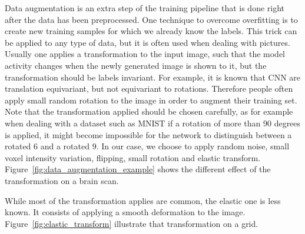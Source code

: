 Data augmentation is an extra step of the training pipeline that is done right after the data has been preprocessed. One technique to overcome overfitting is to create new training samples for which we already know the labels. This trick can be applied to any type of data, but it is often used when dealing with pictures. Usually one applies a transformation to the input image, such that the model activity changes when the newly generated image is shown to it, but the transformation should be labels invariant. 
For example, it is known that CNN are translation equivariant, but not equivariant to rotations. Therefore people often apply small random rotation to the image in order to augment their training set. Note that the transformation applied should be chosen carefully, as for example when dealing with a dataset such as MNIST if a rotation of more than 90 degrees is applied, it might become impossible for the network to distinguish between a rotated $6$ and a rotated $9$. 
In our case, we choose to apply random noise, small voxel intensity variation, flipping, small rotation and elastic transform. Figure~\ref{fig:data_augmentation_example} shows the different effect of the transformation on a brain scan.

While most of the transformation applies are common, the elastic one is less known. It consists of applying a smooth deformation to the image. Figure~\ref{fig:elastic_transform} illustrate that transformation on a grid.


